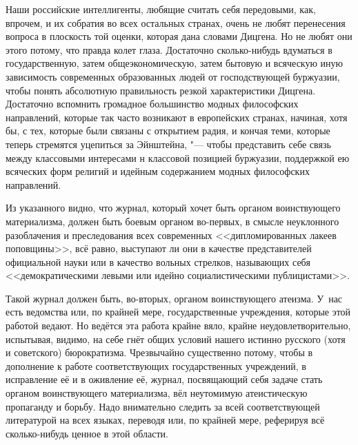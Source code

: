 Наши российские интеллигенты, любящие считать себя передовыми, как, впрочем,
и их собратия во всех остальных странах, очень не любят перенесения вопроса
в плоскость той оценки, которая дана словами Дицгена. Но не любят они этого
потому, что правда колет глаза. Достаточно сколько-нибудь вдуматься в
государственную, затем общеэкономическую, затем бытовую и всяческую иную
зависимость современных образованных людей от господствующей буржуазии,
чтобы понять абсолютную правильность резкой характеристики Дицгена.
Достаточно вспомнить громадное большинство модных философских направлений,
которые так часто возникают в европейских странах, начиная, хотя бы, с тех,
которые были связаны с открытием радия, и кончая теми, которые теперь
стремятся уцепиться за Эйнштейна, "--- чтобы представить себе связь между
классовыми интересами н классовой позицией буржуазии, поддержкой ею
всяческих форм религий и идейным содержанием модных философских
направлений.

Из указанного видно, что журнал, который хочет быть органом воинствующего
материализма, должен быть боевым органом во-первых, в смысле неуклонного
разоблачения и преследования всех современных <<дипломированных лакеев
поповщины>>, всё равно, выступают ли они в качестве представителей
официальной науки или в качество вольных стрелков, называющих себя
<<демократическими левыми или идейно социалистическими публицистами>>.

Такой журнал должен быть, во-вторых, органом воинствующего атеизма. У~нас
есть ведомства или, по крайней мере, государственные учреждения, которые
этой работой ведают. Но ведётся эта работа крайне вяло, крайне
неудовлетворительно, испытывая, видимо, на себе гнёт общих условий нашего
истинно русского (хотя и советского) бюрократизма. Чрезвычайно существенно
потому, чтобы в дополнение к работе соответствующих государственных
учреждений, в исправление её и в оживление её, журнал, посвящающий себя
задаче стать органом воинствующего материализма, вёл неутомимую
атеистическую пропаганду и борьбу. Надо внимательно следить за всей
соответствующей литературой на всех языках, переводя или, по крайней мере,
реферируя всё сколько-нибудь ценное в этой области.

